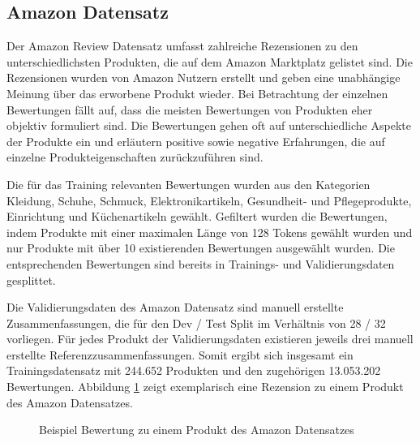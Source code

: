\subsection{Amazon Datensatz}
Der Amazon Review Datensatz \citep{brazinskas2020-unsupervised} umfasst zahlreiche Rezensionen zu den unterschiedlichsten Produkten, die auf dem Amazon Marktplatz gelistet sind.
Die Rezensionen wurden von Amazon Nutzern erstellt und geben eine unabhängige Meinung über das erworbene Produkt wieder.
Bei Betrachtung der einzelnen Bewertungen fällt auf, dass die meisten Bewertungen von Produkten eher objektiv formuliert sind. 
Die Bewertungen gehen oft auf unterschiedliche Aspekte der Produkte ein und erläutern positive sowie negative Erfahrungen, die auf einzelne Produkteigenschaften zurückzuführen sind.



Die für das Training relevanten Bewertungen wurden aus den Kategorien Kleidung, Schuhe, Schmuck, Elektronikartikeln, Gesundheit- und Pflegeprodukte, Einrichtung und Küchenartikeln gewählt.
Gefiltert wurden die Bewertungen, indem Produkte mit einer maximalen Länge von 128 Tokens gewählt wurden und nur Produkte mit über 10 existierenden Bewertungen ausgewählt wurden. 
Die entsprechenden Bewertungen sind bereits in Trainings- und Validierungsdaten gesplittet.

Die Validierungsdaten des Amazon Datensatz sind manuell erstellte Zusammenfassungen, die für den Dev / Test Split im Verhältnis von 28 / 32 vorliegen.
Für jedes Produkt der Validierungsdaten existieren jeweils drei manuell erstellte Referenzzusammenfassungen.
Somit ergibt sich insgesamt ein Trainingsdatensatz mit 244.652 Produkten und den zugehörigen 13.053.202 Bewertungen.
Abbildung \ref{amz_review_example} zeigt exemplarisch eine Rezension zu einem Produkt des Amazon Datensatzes.

\setlength{\fboxsep}{1em}

\begin{figure}[!h]
    \centering
    \scriptsize
    \caption{Beispiel Bewertung zu einem Produkt des Amazon Datensatzes}
    \label{amz_review_example}
\end{figure}

